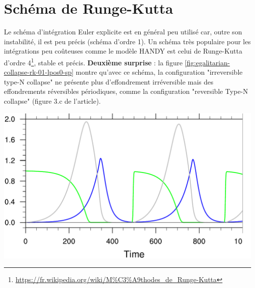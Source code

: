 \documentclass[12pt]{scrartcl}
\begin{document}
\section{Schéma de Runge-Kutta}
Le schéma d'intégration Euler explicite est en général peu utilisé car, outre son instabilité, il est peu précis (schéma d'ordre 1). Un schéma très populaire pour les intégrations peu coûteuses comme le modèle HANDY est celui de Runge-Kutta d'ordre 4\footnote{\url{https://fr.wikipedia.org/wiki/M\%C3\%A9thodes\_de\_Runge-Kutta}}, stable et précis. \textbf{Deuxième surprise} : la figure \ref{fig:egalitarian-collapse-rk-01-lpos0-sp} montre qu'avec ce schéma, la configuration "irreversible type-N collapse" ne présente plus d'effondrement irréversible mais des effondrements réversibles périodiques, comme la configuration "reversible Type-N collapse" (figure 3.c de l'article).

\begin{center}
\includegraphics[width=0.7\linewidth]{../ncl/egalitarian-collapse-rk-01-lpos0-sp.pdf}
\end{center}
\end{document}
